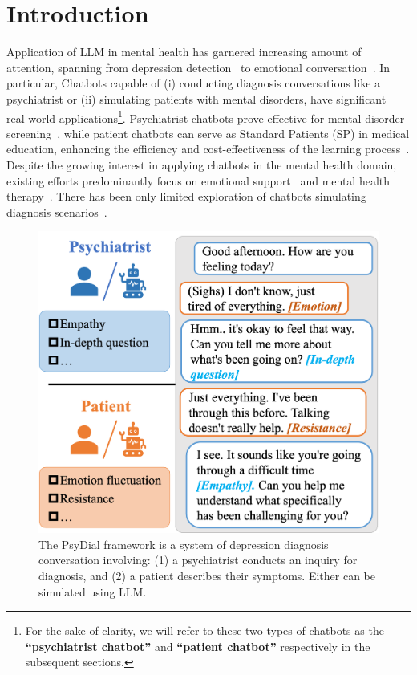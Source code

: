\section{Introduction}
\label{sec:intro}
Application of LLM in mental health has garnered increasing amount of attention, spanning from depression detection~\cite{lamichhane2023evaluation, qin2023read} to emotional conversation~\cite{zhao2023chatgpt}. In particular, Chatbots capable of (i) conducting diagnosis conversations like a psychiatrist or (ii) simulating patients with mental disorders, have significant real-world applications\footnote{For the sake of clarity, we will refer to these two types of chatbots as the \textbf{``psychiatrist chatbot''} and \textbf{``patient chatbot''} respectively in the subsequent sections.}. 
Psychiatrist chatbots prove effective for mental disorder screening~\cite{pacheco2021Smart}, while patient chatbots can serve as Standard Patients (SP) in medical education, enhancing the efficiency and cost-effectiveness of the learning process~\cite{Torous2021growing}.
Despite the growing interest in applying chatbots in the mental health domain, existing efforts predominantly focus on emotional support~\cite{liu2021towards} and mental health therapy~\cite{sabour2022chatbots}.
There has been only limited exploration of chatbots simulating diagnosis scenarios~\cite{yao-etal-2022-d4}. 

\begin{figure}[th]
	\centering
	\includegraphics[width=\linewidth]{Figures/new_overview_1.png}
	\caption{The PsyDial framework is a system of depression diagnosis conversation involving: (1) a psychiatrist conducts an inquiry for diagnosis, and (2) a patient describes their symptoms. Either can be simulated using LLM.}
	\label{fig:overview}
\end{figure}

